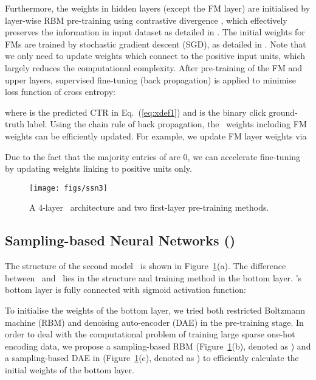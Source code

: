\documentclass{llncs}
\newcommand{\fmnn}{\text{FNN}}
\newcommand{\snn}{\text{SNN}}
\newcommand{\snnrbm}{\text{SNN-RBM}}
\newcommand{\snndae}{\text{SNN-DAE}}
\begin{document}
Furthermore, the weights in hidden layers (except the FM layer) are initialised by layer-wise RBM pre-training \cite{bengio2007greedy} using contrastive divergence \cite{hinton2002training}, which effectively preserves the information in input dataset as detailed in \cite{hinton2006reducing,hinton2010practical}.  The initial weights for FMs are trained by stochastic gradient descent (SGD), as detailed in \cite{rendle2012factorization}. Note that we only need to update weights which connect to the positive input units, which largely reduces the computational complexity. After pre-training of the FM and upper layers, supervised fine-tuning (back propagation) is applied to minimise loss function of cross entropy:

where  is the predicted CTR in Eq.~(\ref{eq:xdef1}) and  is the binary click ground-truth label. Using the chain rule of back propagation, the \fmnn~weights including FM weights can be efficiently updated. For example, we update FM layer weights via

Due to the fact that the majority entries of  are 0, we can accelerate fine-tuning by updating weights linking to positive units only.







\begin{figure}[t]
  \centering
  \vspace{-35pt}
  \texttt{[image: figs/ssn3]}\\
  \caption{A 4-layer \snn~architecture and two first-layer pre-training methods.}\label{fig:snn}
\end{figure}

\subsection{Sampling-based Neural Networks (\snn)}\label{sec:snn}
The structure of the second model \snn~is shown in Figure~\ref{fig:snn}(a). The difference between \snn~and \fmnn~lies in the structure and training method in the bottom layer. \snn's bottom layer is fully connected with sigmoid activation function:


To initialise the weights of the bottom layer, we tried both restricted Boltzmann machine (RBM) \cite{hinton2010practical} and denoising auto-encoder (DAE) \cite{bengio2013generalized} in the pre-training stage. In order to deal with the computational problem of training large sparse one-hot encoding data, we propose a sampling-based RBM (Figure~\ref{fig:snn}(b), denoted as \snnrbm) and a sampling-based DAE in (Figure~\ref{fig:snn}(c), denoted as \snndae) to efficiently calculate the initial weights of the bottom layer.
\end{document}
